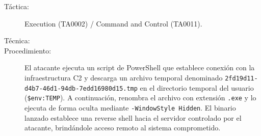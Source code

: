\begin{leftbar}
    \begin{description}
        \item[Táctica:] Execution (TA0002) / Command and Control (TA0011).
        \item[Técnica:]
        \item[Procedimiento:]  
        El atacante ejecuta un script de PowerShell que establece conexión con la infraestructura C2 y descarga un archivo temporal denominado \texttt{2fd19d11-d4b7-46d1-94db-7edd16980d15.tmp} en el directorio temporal del usuario (\texttt{\$env:TEMP}).  
        A continuación, renombra el archivo con extensión \texttt{.exe} y lo ejecuta de forma oculta mediante \texttt{-WindowStyle Hidden}. El binario lanzado establece una reverse shell hacia el servidor controlado por el atacante, brindándole acceso remoto al sistema comprometido.
    \end{description}
\end{leftbar}

